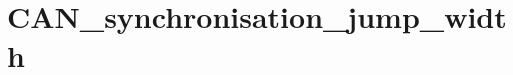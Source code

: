 \hypertarget{group___c_a_n__synchronisation__jump__width}{\section{C\-A\-N\-\_\-synchronisation\-\_\-jump\-\_\-width}
\label{group___c_a_n__synchronisation__jump__width}
}
